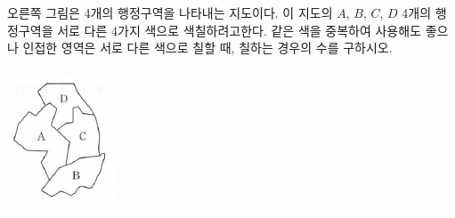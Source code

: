 \documentclass[a4paper]{oblivoir}
\begin{document}
%
\begin{minipage}{.65\textwidth}
\begin{Exercise}
오른쪽 그림은 4개의 행정구역을 나타내는 지도이다. 이 지도의 \(A\), \(B\), \(C\), \(D\) 4개의 행정구역을 서로 다른 4가지 색으로 색칠하려고한다.
같은 색을 중복하여 사용해도 좋으나 인접한 영역은 서로 다른 색으로 칠할 때, 칠하는 경우의 수를 구하시오.
\end{Exercise}
\end{minipage}
\quad
\begin{minipage}{.25\textwidth}
\includegraphics[width=.5\textwidth]{8}
\end{minipage}


\newpage
\shipoutAnswer
\end{document}
